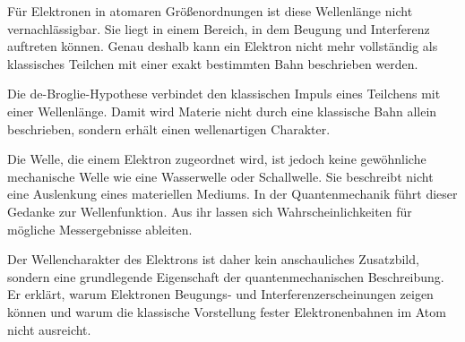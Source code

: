 Für Elektronen in atomaren Größenordnungen ist diese Wellenlänge nicht
vernachlässigbar. Sie liegt in einem Bereich, in dem Beugung
und Interferenz auftreten können. Genau deshalb kann ein
Elektron nicht mehr vollständig als klassisches Teilchen mit einer exakt
bestimmten Bahn beschrieben werden.

\begin{PhysicsBox}
	\label{box:broglie_hypothese}
	Die de-Broglie-Hypothese verbindet den klassischen Impuls eines Teilchens mit
	einer Wellenlänge. Damit wird Materie nicht durch eine klassische Bahn allein
	beschrieben, sondern erhält einen wellenartigen Charakter.
\end{PhysicsBox}

Die Welle, die einem Elektron zugeordnet wird, ist jedoch keine gewöhnliche
mechanische Welle wie eine Wasserwelle oder Schallwelle. Sie beschreibt nicht
eine Auslenkung eines materiellen Mediums. In der Quantenmechanik führt dieser
Gedanke zur Wellenfunktion. Aus ihr lassen sich
Wahrscheinlichkeiten für mögliche Messergebnisse
ableiten.

Der Wellencharakter des Elektrons ist
daher kein anschauliches Zusatzbild, sondern eine grundlegende Eigenschaft der
quantenmechanischen Beschreibung. Er erklärt, warum Elektronen Beugungs- und
Interferenzerscheinungen zeigen können und warum die klassische Vorstellung
fester Elektronenbahnen im Atom nicht ausreicht.